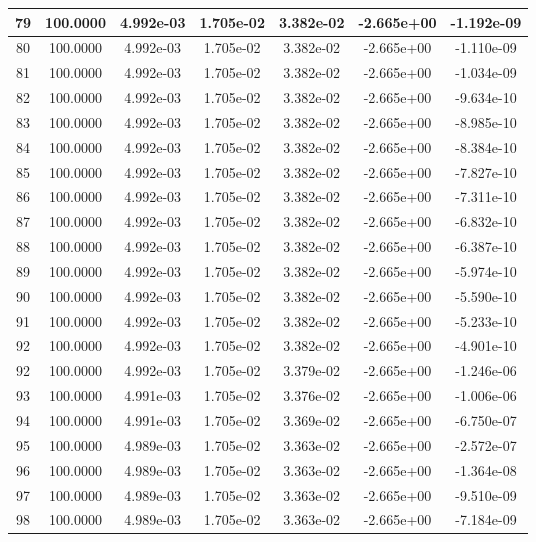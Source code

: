 \documentclass[10pt]{report}
\begin{document}
\begin{table}[H]
\begin{center}
\begin{tabular}{|c|c|c|c|c|c|c|}
79 & 100.0000 & 4.992e-03 & 1.705e-02 & 3.382e-02 & -2.665e+00 & -1.192e-09\\ \hline
80 & 100.0000 & 4.992e-03 & 1.705e-02 & 3.382e-02 & -2.665e+00 & -1.110e-09\\ \hline
81 & 100.0000 & 4.992e-03 & 1.705e-02 & 3.382e-02 & -2.665e+00 & -1.034e-09\\ \hline
82 & 100.0000 & 4.992e-03 & 1.705e-02 & 3.382e-02 & -2.665e+00 & -9.634e-10\\ \hline
83 & 100.0000 & 4.992e-03 & 1.705e-02 & 3.382e-02 & -2.665e+00 & -8.985e-10\\ \hline
84 & 100.0000 & 4.992e-03 & 1.705e-02 & 3.382e-02 & -2.665e+00 & -8.384e-10\\ \hline
85 & 100.0000 & 4.992e-03 & 1.705e-02 & 3.382e-02 & -2.665e+00 & -7.827e-10\\ \hline
86 & 100.0000 & 4.992e-03 & 1.705e-02 & 3.382e-02 & -2.665e+00 & -7.311e-10\\ \hline
87 & 100.0000 & 4.992e-03 & 1.705e-02 & 3.382e-02 & -2.665e+00 & -6.832e-10\\ \hline
88 & 100.0000 & 4.992e-03 & 1.705e-02 & 3.382e-02 & -2.665e+00 & -6.387e-10\\ \hline
89 & 100.0000 & 4.992e-03 & 1.705e-02 & 3.382e-02 & -2.665e+00 & -5.974e-10\\ \hline
90 & 100.0000 & 4.992e-03 & 1.705e-02 & 3.382e-02 & -2.665e+00 & -5.590e-10\\ \hline
91 & 100.0000 & 4.992e-03 & 1.705e-02 & 3.382e-02 & -2.665e+00 & -5.233e-10\\ \hline
92 & 100.0000 & 4.992e-03 & 1.705e-02 & 3.382e-02 & -2.665e+00 & -4.901e-10\\ \hline
92 & 100.0000 & 4.992e-03 & 1.705e-02 & 3.379e-02 & -2.665e+00 & -1.246e-06\\ \hline
93 & 100.0000 & 4.991e-03 & 1.705e-02 & 3.376e-02 & -2.665e+00 & -1.006e-06\\ \hline
94 & 100.0000 & 4.991e-03 & 1.705e-02 & 3.369e-02 & -2.665e+00 & -6.750e-07\\ \hline
95 & 100.0000 & 4.989e-03 & 1.705e-02 & 3.363e-02 & -2.665e+00 & -2.572e-07\\ \hline
96 & 100.0000 & 4.989e-03 & 1.705e-02 & 3.363e-02 & -2.665e+00 & -1.364e-08\\ \hline
97 & 100.0000 & 4.989e-03 & 1.705e-02 & 3.363e-02 & -2.665e+00 & -9.510e-09\\ \hline
98 & 100.0000 & 4.989e-03 & 1.705e-02 & 3.363e-02 & -2.665e+00 & -7.184e-09\\ \hline

\end{tabular}
\end{center}
\end{table}
\end{document}
